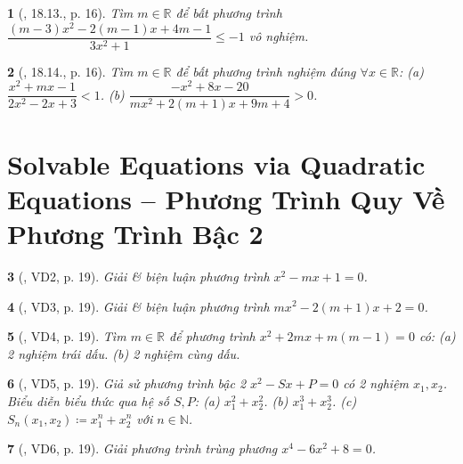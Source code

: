 \documentclass{article}
\newtheorem{baitoan}{}
\begin{document}
\begin{baitoan}[\cite{Hai_Hung_Thu_Tung_ncpt_Toan_10_tap_2}, 18.13., p. 16]
	Tìm $m\in\mathbb{R}$ để bất phương trình $\dfrac{(m - 3)x^2 - 2(m - 1)x + 4m - 1}{3x^2 + 1}\le-1$ vô nghiệm.
\end{baitoan}

\begin{baitoan}[\cite{Hai_Hung_Thu_Tung_ncpt_Toan_10_tap_2}, 18.14., p. 16]
	Tìm $m\in\mathbb{R}$ để bất phương trình nghiệm đúng $\forall x\in\mathbb{R}$: (a) $\dfrac{x^2 + mx - 1}{2x^2 - 2x + 3} < 1$. (b) $\dfrac{-x^2 + 8x - 20}{mx^2 + 2(m + 1)x + 9m + 4} > 0$.
\end{baitoan}


\section{Solvable Equations via Quadratic Equations -- Phương Trình Quy Về Phương Trình Bậc 2}

\begin{baitoan}[\cite{Hai_Hung_Thu_Tung_ncpt_Toan_10_tap_2}, VD2, p. 19]
	Giải \& biện luận phương trình $x^2 - mx + 1 = 0$.
\end{baitoan}

\begin{baitoan}[\cite{Hai_Hung_Thu_Tung_ncpt_Toan_10_tap_2}, VD3, p. 19]
	Giải \& biện luận phương trình $mx^2 - 2(m + 1)x + 2 = 0$.
\end{baitoan}

\begin{baitoan}[\cite{Hai_Hung_Thu_Tung_ncpt_Toan_10_tap_2}, VD4, p. 19]
	Tìm $m\in\mathbb{R}$ để phương trình $x^2 + 2mx + m(m - 1) = 0$ có: (a) 2 nghiệm trái dấu. (b) 2 nghiệm cùng dấu.
\end{baitoan}

\begin{baitoan}[\cite{Hai_Hung_Thu_Tung_ncpt_Toan_10_tap_2}, VD5, p. 19]
	Giả sử phương trình bậc 2 $x^2 - Sx + P = 0$ có 2 nghiệm $x_1,x_2$. Biểu diễn biểu thức qua hệ số $S,P$: (a) $x_1^2 + x_2^2$. (b) $x_1^3 + x_2^3$. (c) $S_n(x_1,x_2)\coloneqq x_1^n + x_2^n$ với $n\in\mathbb{N}$.
\end{baitoan}

\begin{baitoan}[\cite{Hai_Hung_Thu_Tung_ncpt_Toan_10_tap_2}, VD6, p. 19]
	Giải phương trình trùng phương $x^4 - 6x^2 + 8 = 0$.
\end{baitoan}
\end{document}
